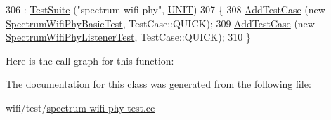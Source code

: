 \begin{DoxyCode}
306   : \hyperlink{classns3_1_1TestSuite_a904b0c40583b744d30908aeb94636d1a}{TestSuite} (\textcolor{stringliteral}{"spectrum-wifi-phy"}, \hyperlink{classns3_1_1TestSuite_a1ebfcab34ec8161e085e8e3a1855eae0a3885375a3787abf60431f8454b3cadbd}{UNIT})
307 \{
308   \hyperlink{classns3_1_1TestCase_a3718088e3eefd5d6454569d2e0ddd835}{AddTestCase} (\textcolor{keyword}{new} \hyperlink{classSpectrumWifiPhyBasicTest}{SpectrumWifiPhyBasicTest}, TestCase::QUICK);
309   \hyperlink{classns3_1_1TestCase_a3718088e3eefd5d6454569d2e0ddd835}{AddTestCase} (\textcolor{keyword}{new} \hyperlink{classSpectrumWifiPhyListenerTest}{SpectrumWifiPhyListenerTest}, TestCase::QUICK);
310 \}
\end{DoxyCode}


Here is the call graph for this function\+:




The documentation for this class was generated from the following file\+:\begin{DoxyCompactItemize}
\item 
wifi/test/\hyperlink{spectrum-wifi-phy-test_8cc}{spectrum-\/wifi-\/phy-\/test.\+cc}\end{DoxyCompactItemize}
